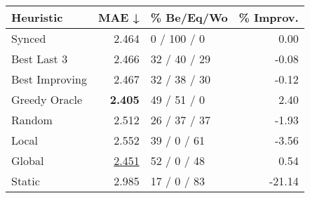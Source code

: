 \begin{tabular}{lrlr}
\toprule
\textbf{Heuristic} & \textbf{MAE ↓} & \textbf{\% Be/Eq/Wo} & \textbf{\% Improv.} \\
\midrule
            Synced &          2.464 &          0 / 100 / 0 &                0.00 \\
\midrule
       Best Last 3 &          2.466 &         32 / 40 / 29 &               -0.08 \\
    Best Improving &          2.467 &         32 / 38 / 30 &               -0.12 \\
\addlinespace
     Greedy Oracle &          \textbf{2.405} &          49 / 51 / 0 &                2.40 \\
            Random &          2.512 &         26 / 37 / 37 &               -1.93 \\
\midrule
             Local &          2.552 &          39 / 0 / 61 &               -3.56 \\
            Global &          \underline{2.451} &          52 / 0 / 48 &                0.54 \\
\midrule
            Static &          2.985 &          17 / 0 / 83 &              -21.14 \\
\bottomrule
\end{tabular}

\label{tab:hr_non_lr05_le2_bs4_Summary}
